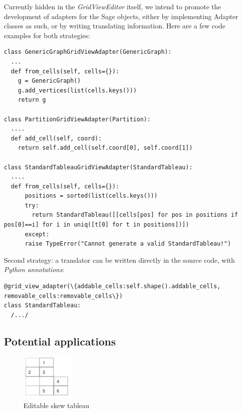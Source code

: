 \documentclass{deliverablereport}
\begin{document}
Currently hidden in the \emph{GridViewEditor} itself, we intend to promote
the development of adapters for the Sage objects, either by implementing Adapter
classes as such, or by writing translating information. Here are a few code examples
for both strategies:

\begin{lstlisting}
class GenericGraphGridViewAdapter(GenericGraph):
  ...
  def from_cells(self, cells={}):
    g = GenericGraph()
    g.add_vertices(list(cells.keys()))
    return g

class PartitionGridViewAdapter(Partition):
  ....
  def add_cell(self, coord):
    return self.add_cell(self.coord[0], self.coord[1])

class StandardTableauGridViewAdapter(StandardTableau):
  ....
  def from_cells(self, cells={}):
      positions = sorted(list(cells.keys()))
      try:
        return StandardTableau([[cells[pos] for pos in positions if pos[0]==i] for i in uniq([t[0] for t in positions])])
      except:
      raise TypeError("Cannot generate a valid StandardTableau!")
\end{lstlisting}

Second strategy: a translator can be written directly in the source
code, with \emph{Python annotations}:

\begin{lstlisting}
@grid_view_adapter(\{addable_cells:self.shape().addable_cells, removable_cells:removable_cells\})
class StandardTableau:
  /.../
\end{lstlisting}


\subsection{Potential applications}


\begin{figure}
    \begin{center}
      \includegraphics[width=100px]{images/SkewTableauWidget}
      \caption{Editable skew tableau}
\end{center}
\end{figure}
\end{document}
